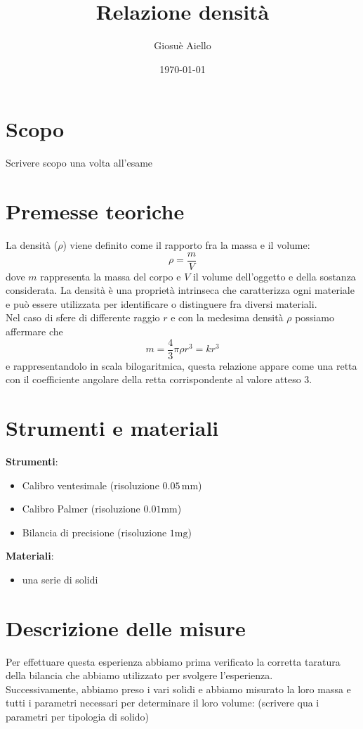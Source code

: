 \documentclass{article}
\title{Relazione densità}
\author{Giosuè Aiello}
\date{\today}
\begin{document}
	\maketitle
	\section{Scopo}
	Scrivere scopo una volta all'esame
	\section{Premesse teoriche}
	La densità ($\rho$) viene definito come il rapporto fra la massa e il volume:
	\begin{equation}
		\rho = \frac{m}{V}
	\end{equation}
	dove $m$ rappresenta la massa del corpo e $V$ il volume dell'oggetto e della sostanza considerata. La densità è una proprietà intrinseca che caratterizza ogni materiale e può essere utilizzata per identificare o distinguere fra diversi materiali. \\
	Nel caso di sfere di differente raggio $r$ e con la medesima densità $\rho$ possiamo affermare che
	\begin{equation}
	m = \frac{4}{3} \pi \rho r^3 = kr^3
	\end{equation}
	e rappresentandolo in scala bilogaritmica, questa relazione appare come una retta con il coefficiente angolare della retta corrispondente al valore atteso 3.
\section{Strumenti e materiali}
	\textbf{Strumenti}:	
	\begin{itemize}
		\item Calibro ventesimale (risoluzione $0.05 \, \si{\milli\meter}$)
		\item Calibro Palmer (risoluzione $0.01 \si{\milli\meter}$)
		\item Bilancia di precisione (risoluzione $1 \si{\milli\gram}$)
	\end{itemize}
	\textbf{Materiali}:
	\begin{itemize}
		\item una serie di solidi
	\end{itemize}
\section{Descrizione delle misure}
Per effettuare questa esperienza abbiamo prima verificato la corretta taratura della bilancia che abbiamo utilizzato per svolgere l'esperienza. \\
Successivamente, abbiamo preso i vari solidi e abbiamo misurato la loro massa e tutti i parametri necessari per determinare il loro volume: (scrivere qua i parametri per tipologia di solido)
\end{document}

